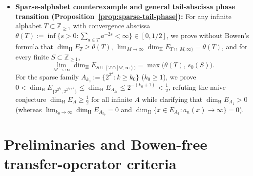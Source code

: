 \documentclass[11pt]{article}
\theoremstyle{definition}
\theoremstyle{remark}
\newcommand{\R}{\mathbb{R}}
\newcommand{\Z}{\mathbb{Z}}
\newcommand{\dimH}{\dim_{\mathrm{H}}}
\begin{document}
\begin{itemize}[leftmargin=1.6em]
and $(1-2s_0(S_k))/\gamma_k\to\xi\in\R$,
\[
\frac{\dimH F_{m_k,S_k,B_k}-\frac12}{\frac12\,\gamma_k}
\longrightarrow \Phi_0(\xi):=\frac{-\xi+\sqrt{\xi^2+4}}{2}.
\]
For a fixed finite $S$ with $s_0(S)=\tfrac12$ (whose existence among finite
integer alphabets remains open), all uniformity hypotheses hold automatically
and the master equation yields the two-term law
\[
\dimH F_{m,S,B}-\frac12
=\frac{\sqrt{d\,\kappa(S)}}{2}\,m^{-1/2}
-\frac{d\,\kappa(S)\,\log m}{4\,m}+O_{S,B}(m^{-1}).
\]
\item \textbf{Sparse-alphabet counterexample and general tail-abscissa phase
transition (Proposition~\ref{prop:sparse-tail-phase}):}
For any infinite alphabet $T\subset\Z_{\ge1}$ with convergence abscissa
$\theta(T):=\inf\{s>0:\sum_{a\in T}a^{-2s}<\infty\}\in[0,1/2]$, we prove
without Bowen's formula that $\dimH E_T\ge\theta(T)$,
$\lim_{M\to\infty}\dimH E_{T\cap[M,\infty)}=\theta(T)$, and for every finite
$S\subset\Z_{\ge1}$,
\[
\lim_{M\to\infty}\dimH E_{S\cup(T\cap[M,\infty))}
=\max\bigl(\theta(T),\,s_0(S)\bigr).
\]
For the sparse family $A_{k_0}:=\{2^{2^k}:k\ge k_0\}$ ($k_0\ge1$), we prove
$0<\dimH E_{\{2^{2^{k_0}},2^{2^{k_0+1}}\}}\le\dimH E_{A_{k_0}}\le 2^{-(k_0+1)}<\frac12$,
refuting the naive conjecture $\dimH E_A\ge\frac12$ for all infinite $A$ while
clarifying that $\dimH E_{A_1}>0$ (whereas $\lim_{k_0\to\infty}\dimH E_{A_{k_0}}=0$
and $\dimH\{x\in E_{A_1}:a_n(x)\to\infty\}=0$).
\end{itemize}

\section{Preliminaries and Bowen-free transfer-operator criteria}\label{sec:prelim}
\end{document}
